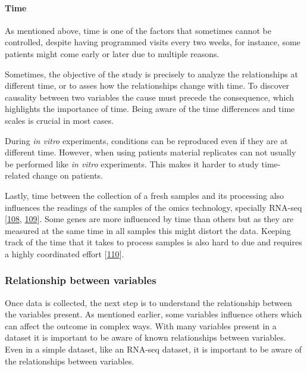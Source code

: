 \documentclass[
  a4paper,
]{book}
\begin{document}
\hypertarget{time}{%
\paragraph*{Time}\label{time}}

As mentioned above, time is one of the factors that sometimes cannot be controlled, despite having programmed visits every two weeks, for instance, some patients might come early or later due to multiple reasons.

Sometimes, the objective of the study is precisely to analyze the relationships at different time, or to asses how the relationships change with time.
To discover causality between two variables the cause must precede the consequence, which highlights the importance of time.
Being aware of the time differences and time scales is crucial in most cases.

During \emph{in vitro} experiments, conditions can be reproduced even if they are at different time.
However, when using patients material replicates can not usually be performed like \emph{in vitro} experiments.
This makes it harder to study time-related change on patients.

Lastly, time between the collection of a fresh samples and its processing also influences the readings of the samples of the omics technology, specially RNA-seq {[}\protect\hyperlink{ref-massoni-badosa2020}{108}, \protect\hyperlink{ref-zhu2017}{109}{]}.
Some genes are more influenced by time than others but as they are measured at the same time in all samples this might distort the data.
Keeping track of the time that it takes to process samples is also hard to due and requires a highly coordinated effort {[}\protect\hyperlink{ref-ferreira2018}{110}{]}.

\hypertarget{relationship-between-variables}{%
\subsubsection{Relationship between variables}\label{relationship-between-variables}}

Once data is collected, the next step is to understand the relationship between the variables present.
As mentioned earlier, some variables influence others which can affect the outcome in complex ways.
With many variables present in a dataset it is important to be aware of known relationships between variables.
Even in a simple dataset, like an RNA-seq dataset, it is important to be aware of the relationships between variables.
\end{document}
